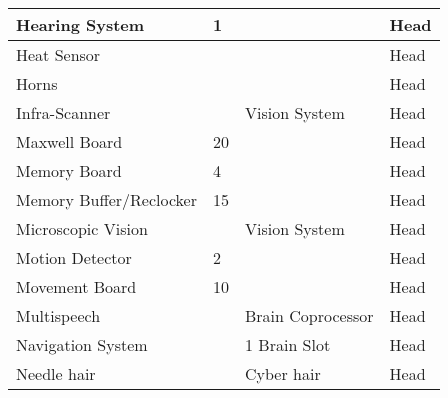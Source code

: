 \documentclass[twoside]{book}
\begin{document}
\begin{longtable}{p{1.25in}p{2em}ll}
  \raggedright
           Hearing System 
  &
   1 
  &
  
  &
   Head 
  \tabularnewline
  \hline
      
  \raggedright
           Heat Sensor 
  &
  
  &
  
  &
   Head 
  \tabularnewline
  \hline
      
  \raggedright
           Horns 
  &
  
  &
  
  &
   Head 
  \tabularnewline
  \hline
      
  \raggedright
           Infra-Scanner 
  &
  
  &
   Vision System 
  &
   Head 
  \tabularnewline
  \hline
      
  \raggedright
           Maxwell Board 
  &
   20 
  &
  
  &
   Head 
  \tabularnewline
  \hline
      
  \raggedright
           Memory Board 
  &
   4 
  &
  
  &
   Head 
  \tabularnewline
  \hline
      
  \raggedright
           Memory Buffer/Reclocker
           
  &
   15 
  &
  
  &
   Head 
  \tabularnewline
  \hline
      
  \raggedright
           Microscopic Vision 
  &
  
  &
   Vision System 
  &
   Head 
  \tabularnewline
  \hline
      
  \raggedright
           Motion Detector 
  &
   2 
  &
  
  &
   Head 
  \tabularnewline
  \hline
      
  \raggedright
           Movement Board 
  &
   10 
  &
  
  &
   Head 
  \tabularnewline
  \hline
      
  \raggedright
           Multispeech 
  &
  
  &
   Brain Coprocessor
           
  &
   Head 
  \tabularnewline
  \hline
      
  \raggedright
           Navigation System 
  &
  
  &
   1 Brain Slot 
  &
   Head 
  \tabularnewline
  \hline
      
  \raggedright
           Needle hair 
  &
  
  &
   Cyber hair 
  &
   Head 
  \tabularnewline
  \hline
      

\end{longtable}
\end{document}
